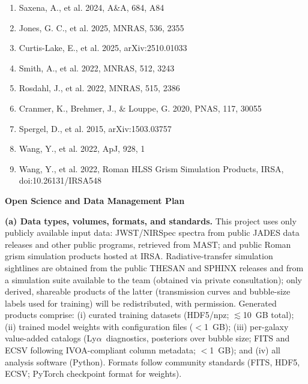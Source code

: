 \documentclass[12pt,letterpaper]{article}
\newcommand{\lya}{Ly$\alpha$}
\begin{document}
\begin{enumerate}
\item Saxena, A., et al. 2024, A\&A, 684, A84 %
\item Jones, G. C., et al. 2025, MNRAS, 536, 2355 %
\item Curtis-Lake, E., et al. 2025, arXiv:2510.01033 %
\item Smith, A., et al. 2022, MNRAS, 512, 3243 %
\item Rosdahl, J., et al. 2022, MNRAS, 515, 2386 %
\item Cranmer, K., Brehmer, J., \& Louppe, G. 2020, PNAS, 117, 30055
\item Spergel, D., et al. 2015, arXiv:1503.03757 %
\item Wang, Y., et al. 2022, ApJ, 928, 1 %
\item Wang, Y., et al. 2022, Roman HLSS Grism Simulation Products, IRSA, doi:10.26131/IRSA548 %
\end{enumerate}

\clearpage
\begin{center}{\large\bfseries Open Science and Data Management Plan}\end{center}

\noindent\textbf{(a) Data types, volumes, formats, and standards.}
This project uses only publicly available input data: JWST/NIRSpec
spectra from public JADES data releases and other public programs,
retrieved from MAST; and public Roman grism simulation products hosted at
IRSA. Radiative-transfer simulation sightlines are obtained from the
public THESAN and SPHINX releases and from a simulation suite available
to the team (obtained via private consultation); only derived,
shareable products of the latter (transmission curves and bubble-size
labels used for training) will be redistributed, with permission.
Generated products comprise: (i) curated training datasets
(HDF5/npz; $\lesssim$10~GB total); (ii) trained model weights with
configuration files ($<$1~GB); (iii) per-galaxy value-added catalogs
(\lya\ diagnostics, posteriors over bubble size; FITS and ECSV following
IVOA-compliant column metadata; $<$1~GB); and (iv) all analysis software
(Python). Formats follow community standards (FITS, HDF5, ECSV; PyTorch
checkpoint format for weights).
\end{document}
